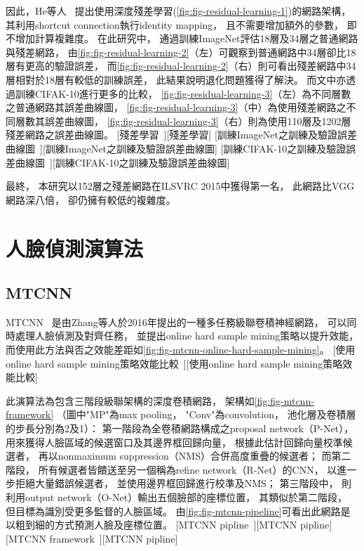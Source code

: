 \documentclass[class=NCU_thesis, crop=false]{standalone}
\begin{document}
因此，He等人~\cite{he_deep_2016}
提出使用深度殘差學習(\cref{fig:fig-residual-learning-1})的網路架構，
其利用shortcut connection執行identity mapping，
且不需要增加額外的參數，
即不增加計算複雜度。
在此研究中，
通過訓練ImageNet評估18層及34層之普通網路與殘差網路，
由\cref{fig:fig-residual-learning-2}（左）可觀察到普通網路中34層卻比18層有更高的驗證誤差，
而\cref{fig:fig-residual-learning-2}（右）則可看出殘差網路中34層相對於18層有較低的訓練誤差，
此結果說明退化問題獲得了解決。
而文中亦透過訓練CIFAK-10進行更多的比較，
\cref{fig:fig-residual-learning-3}（左）為不同層數之普通網路其誤差曲線圖，
\cref{fig:fig-residual-learning-3}（中）為使用殘差網路之不同層數其誤差曲線圖，
\cref{fig:fig-residual-learning-3}（右）則為使用110層及1202層殘差網路之誤差曲線圖。
[殘差學習~\cite{he_deep_2016}][殘差學習]
[訓練ImageNet之訓練及驗證誤差曲線圖~\cite{he_deep_2016}][訓練ImageNet之訓練及驗證誤差曲線圖]
[訓練CIFAK-10之訓練及驗證誤差曲線圖~\cite{he_deep_2016}][訓練CIFAK-10之訓練及驗證誤差曲線圖]

最終，
本研究以152層之殘差網路在ILSVRC 2015中獲得第一名，
此網路比VGG網路深八倍，
卻仍擁有較低的複雜度。

\section{人臉偵測演算法}
\subsection{MTCNN}
MTCNN~\cite{zhang_joint_2016}
是由Zhang等人於2016年提出的一種多任務級聯卷積神經網路，
可以同時處理人臉偵測及對齊任務，
並提出online hard sample mining策略以提升效能，
而使用此方法與否之效能差距如\cref{fig:fig-mtcnn-online-hard-sample-mining}。
[使用online hard sample mining策略效能比較~\cite{zhang_joint_2016}][使用online hard sample mining策略效能比較]

此演算法為包含三階段級聯架構的深度卷積網路，
架構如\cref{fig:fig-mtcnn-framework}
（圖中"MP"為max pooling，
"Conv"為convolution，
池化層及卷積層的步長分別為2及1）：
第一階段為全卷積網路構成之proposal network（P-Net），
用來獲得人臉區域的候選窗口及其邊界框回歸向量，
根據此估計回歸向量校準候選者，
再以nonmaximum suppression（NMS）合併高度重疊的候選者；
而第二階段，
所有候選者皆饋送至另一個稱為refine network（R-Net）的CNN，
以進一步拒絕大量錯誤候選者，
並使用邊界框回歸進行校準及NMS；
第三階段中，
則利用output network（O-Net）輸出五個臉部的座標位置，
其類似於第二階段，
但目標為識別受更多監督的人臉區域。
由\cref{fig:fig-mtcnn-pipeline}可看出此網路是以粗到細的方式預測人臉及座標位置。
[MTCNN pipline~\cite{zhang_joint_2016}][MTCNN pipline]
[MTCNN framework~\cite{zhang_joint_2016}][MTCNN pipline]
\end{document}
